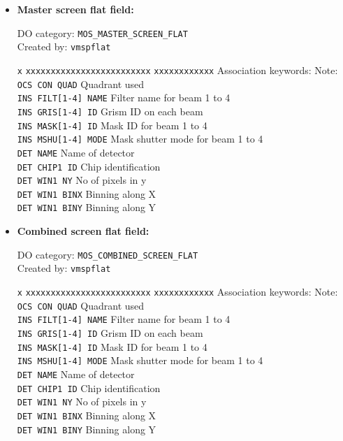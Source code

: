 \begin{itemize}

\item {\bf Master screen flat field:}

DO category: {\tt MOS\_MASTER\_SCREEN\_FLAT} \\
Created by: {\tt vmspflat}

\begin{tabbing}
{\tt x} \= {\tt xxxxxxxxxxxxxxxxxxxxxxxxx} \= {\tt xxxxxxxxxxxx} \kill
\> Association keywords: \> Note: \\
\> {\tt OCS CON QUAD} \> Quadrant used \\
\> {\tt INS FILT[1-4] NAME} \> Filter name for beam 1 to 4 \\
\> {\tt INS GRIS[1-4] ID} \> Grism ID on each beam \\
\> {\tt INS MASK[1-4] ID} \> Mask ID for beam 1 to 4\\
\> {\tt INS MSHU[1-4] MODE} \> Mask shutter mode for beam 1 to 4\\
\> {\tt DET NAME} \> Name of detector \\
\> {\tt DET CHIP1 ID} \> Chip identification \\
\> {\tt DET WIN1 NY} \> No of pixels in y \\
\> {\tt DET WIN1 BINX} \> Binning along X \\
\> {\tt DET WIN1 BINY} \> Binning along Y \\
\end{tabbing}

\item {\bf Combined screen flat field:}

DO category: {\tt MOS\_COMBINED\_SCREEN\_FLAT} \\
Created by: {\tt vmspflat}

\begin{tabbing}
{\tt x} \= {\tt xxxxxxxxxxxxxxxxxxxxxxxxx} \= {\tt xxxxxxxxxxxx} \kill
\> Association keywords: \> Note: \\
\> {\tt OCS CON QUAD} \> Quadrant used \\
\> {\tt INS FILT[1-4] NAME} \> Filter name for beam 1 to 4 \\
\> {\tt INS GRIS[1-4] ID} \> Grism ID on each beam \\
\> {\tt INS MASK[1-4] ID} \> Mask ID for beam 1 to 4\\
\> {\tt INS MSHU[1-4] MODE} \> Mask shutter mode for beam 1 to 4\\
\> {\tt DET NAME} \> Name of detector \\
\> {\tt DET CHIP1 ID} \> Chip identification \\
\> {\tt DET WIN1 NY} \> No of pixels in y \\
\> {\tt DET WIN1 BINX} \> Binning along X \\
\> {\tt DET WIN1 BINY} \> Binning along Y \\
\end{tabbing}


\end{itemize}
